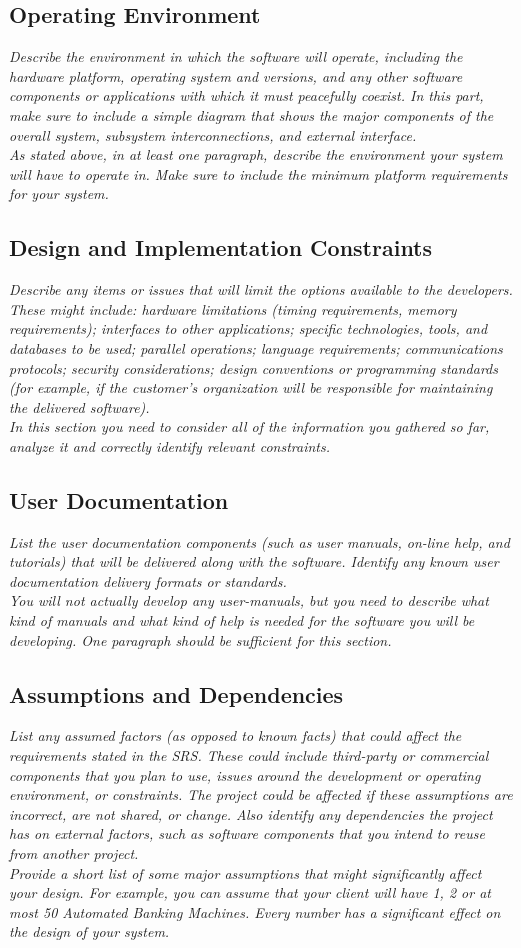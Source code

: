 \documentclass{article}
\newcommand{\gnl}{\vspace{1em}\\}      %
\begin{document}
    \subsection{Operating Environment}
        \emph{Describe the environment in which the software will operate, including the hardware platform, operating system and versions, and any other software components or applications with which it must peacefully coexist. In this part, make sure to include a simple diagram that shows the major components of the overall system, subsystem interconnections, and external interface.\gnl As stated above, in at least one paragraph, describe the environment your system will have to operate in. Make sure to include the minimum platform requirements for your system.}
    \subsection{Design and Implementation Constraints}
        \emph{Describe any items or issues that will limit the options available to the developers. These might include: hardware limitations (timing requirements, memory requirements); interfaces to other applications; specific technologies, tools, and databases to be used; parallel operations; language requirements; communications protocols; security considerations; design conventions or programming standards (for example, if the customer’s organization will be responsible for maintaining the delivered software).\gnl In this section you need to consider all of the information you gathered so far, analyze it and correctly identify relevant constraints.}
    \subsection{User Documentation}
        \emph{List the user documentation components (such as user manuals, on-line help, and tutorials) that will be delivered along with the software. Identify any known user documentation delivery formats or standards.\gnl You will not actually develop any user-manuals, but you need to describe what kind of manuals and what kind of help is needed for the software you will be developing. One paragraph should be sufficient for this section.}
    \subsection{Assumptions and Dependencies}
        \emph{List any assumed factors (as opposed to known facts) that could affect the requirements stated in the SRS. These could include third-party or commercial components that you plan to use, issues around the development or operating environment, or constraints. The project could be affected if these assumptions are incorrect, are not shared, or change. Also identify any dependencies the project has on external factors, such as software components that you intend to reuse from another project.\gnl Provide a short list of some major assumptions that might significantly affect your design. For example, you can assume that your client will have 1, 2 or at most 50 Automated Banking Machines. Every number has a significant effect on the design of your system.}
\pagebreak
\end{document}
